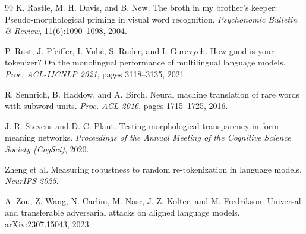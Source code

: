 \documentclass[11pt,a4paper]{article}
\begin{document}
\begin{thebibliography}{99}
K. Rastle, M. H. Davis, and B. New.
\newblock The broth in my brother's keeper: Pseudo-morphological priming in visual word recognition.
\newblock \emph{Psychonomic Bulletin \& Review}, 11(6):1090--1098, 2004.

P. Rust, J. Pfeiffer, I. Vulić, S. Ruder, and I. Gurevych.
\newblock How good is your tokenizer? On the monolingual performance of multilingual language models.
\newblock \emph{Proc. ACL-IJCNLP 2021}, pages 3118--3135, 2021.

R. Sennrich, B. Haddow, and A. Birch.
\newblock Neural machine translation of rare words with subword units.
\newblock \emph{Proc. ACL 2016}, pages 1715--1725, 2016.

J. R. Stevens and D. C. Plaut.
\newblock Testing morphological transparency in form-meaning networks.
\newblock \emph{Proceedings of the Annual Meeting of the Cognitive Science Society (CogSci)}, 2020.

Zheng et al.
\newblock Measuring robustness to random re-tokenization in language models.
\newblock \emph{NeurIPS 2025}.

A. Zou, Z. Wang, N. Carlini, M. Nasr, J. Z. Kolter, and M. Fredrikson.
\newblock Universal and transferable adversarial attacks on aligned language models.
\newblock arXiv:2307.15043, 2023.

\end{thebibliography}
\end{document}
